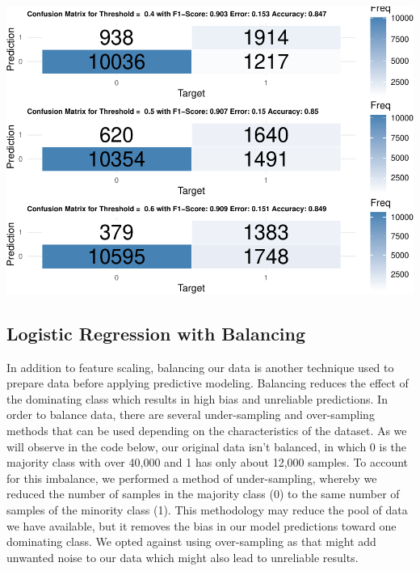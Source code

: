 \documentclass[
]{article}
\newenvironment{Shaded}{\begin{snugshade}}{\end{snugshade}}
\newcommand{\CommentTok}[1]{\textcolor[rgb]{0.56,0.35,0.01}{\textit{#1}}}
\newcommand{\FunctionTok}[1]{\textcolor[rgb]{0.00,0.00,0.00}{#1}}
\newcommand{\NormalTok}[1]{#1}
\newcommand{\SpecialCharTok}[1]{\textcolor[rgb]{0.00,0.00,0.00}{#1}}
\begin{document}
\includegraphics{Rain_Australia_files/figure-latex/log. regression w/o balancing or feature selection-1.pdf}

\hypertarget{logistic-regression-with-balancing}{%
\subsection{Logistic Regression with
Balancing}\label{logistic-regression-with-balancing}}

In addition to feature scaling, balancing our data is another technique
used to prepare data before applying predictive modeling. Balancing
reduces the effect of the dominating class which results in high bias
and unreliable predictions. In order to balance data, there are several
under-sampling and over-sampling methods that can be used depending on
the characteristics of the dataset. As we will observe in the code
below, our original data isn't balanced, in which 0 is the majority
class with over 40,000 and 1 has only about 12,000 samples. To account
for this imbalance, we performed a method of under-sampling, whereby we
reduced the number of samples in the majority class (0) to the same
number of samples of the minority class (1). This methodology may reduce
the pool of data we have available, but it removes the bias in our model
predictions toward one dominating class. We opted against using
over-sampling as that might add unwanted noise to our data which might
also lead to unreliable results.

\begin{Shaded}
\end{Shaded}
\end{document}
